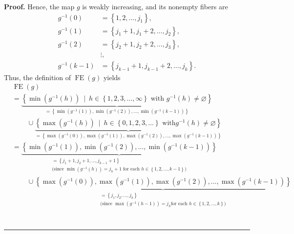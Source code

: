 \documentclass[numbers=enddot,12pt,final,onecolumn,notitlepage]{scrartcl}%
\theoremstyle{definition}
\newenvironment{proof}[1][Proof]{\noindent\textbf{#1.} }{\ \rule{0.5em}{0.5em}}
\newenvironment{verlong}{}{}
\begin{document}
\begin{verlong}
\begin{proof}
Hence, the map $g$ is weakly increasing, and its nonempty fibers are
\begin{align*}
g^{-1}\left(  0\right)   &  =\left\{  1,2,\ldots,j_{1}\right\}  ,\\
g^{-1}\left(  1\right)   &  =\left\{  j_{1}+1,j_{1}+2,\ldots,j_{2}\right\}
,\\
g^{-1}\left(  2\right)   &  =\left\{  j_{2}+1,j_{2}+2,\ldots,j_{3}\right\}
,\\
&  \vdots,\\
g^{-1}\left(  k-1\right)   &  =\left\{  j_{k-1}+1,j_{k-1}+2,\ldots
,j_{k}\right\}  .
\end{align*}
Thus, the definition of $\operatorname*{FE}\left(  g\right)  $ yields%
\begin{align*}
&  \operatorname*{FE}\left(  g\right) \\
&  =\underbrace{\left\{  \min\left(  g^{-1}\left(  h\right)  \right)
\ \mid\ h\in\left\{  1,2,3,\ldots,\infty\right\}  \text{ with }g^{-1}\left(
h\right)  \neq\varnothing\right\}  }_{=\left\{  \min\left(  g^{-1}\left(
1\right)  \right)  ,\min\left(  g^{-1}\left(  2\right)  \right)  ,\ldots
,\min\left(  g^{-1}\left(  k-1\right)  \right)  \right\}  }\\
&  \ \ \ \ \ \ \ \ \ \ \cup\underbrace{\left\{  \max\left(  g^{-1}\left(
h\right)  \right)  \ \mid\ h\in\left\{  0,1,2,3,\ldots\right\}  \text{ with
}g^{-1}\left(  h\right)  \neq\varnothing\right\}  }_{=\left\{  \max\left(
g^{-1}\left(  0\right)  \right)  ,\max\left(  g^{-1}\left(  1\right)  \right)
,\max\left(  g^{-1}\left(  2\right)  \right)  ,\ldots,\max\left(
g^{-1}\left(  k-1\right)  \right)  \right\}  }\\
&  =\underbrace{\left\{  \min\left(  g^{-1}\left(  1\right)  \right)
,\min\left(  g^{-1}\left(  2\right)  \right)  ,\ldots,\min\left(
g^{-1}\left(  k-1\right)  \right)  \right\}  }_{\substack{=\left\{
j_{1}+1,j_{2}+1,\ldots,j_{k-1}+1\right\}  \\\text{(since }\min\left(
g^{-1}\left(  h\right)  \right)  =j_{h}+1\text{ for each }h\in\left\{
1,2,\ldots,k-1\right\}  \text{)}}}\\
&  \ \ \ \ \ \ \ \ \ \ \cup\underbrace{\left\{  \max\left(  g^{-1}\left(
0\right)  \right)  ,\max\left(  g^{-1}\left(  1\right)  \right)  ,\max\left(
g^{-1}\left(  2\right)  \right)  ,\ldots,\max\left(  g^{-1}\left(  k-1\right)
\right)  \right\}  }_{\substack{=\left\{  j_{1},j_{2},\ldots,j_{k}\right\}
\\\text{(since }\max\left(  g^{-1}\left(  h-1\right)  \right)  =j_{h}\text{
for each }h\in\left\{  1,2,\ldots,k\right\}  \text{)}}}\\

\end{align*}
\end{proof}
\end{verlong}
\end{document}
